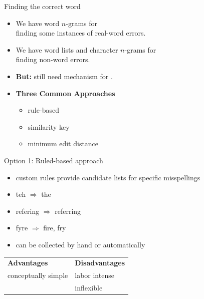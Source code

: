 \documentclass[professionalfonts, xcolor={usenames,svgnames,x11names,table}]{beamer}
\begin{document}
\begin{frame}{Finding the correct word}
    \begin{itemize}
        \item We have word $n$-grams for\\
              finding some instances of real-word errors.
        \item We have word lists and character $n$-grams for\\
              finding non-word errors.
        \item \textbf{But:} still need mechanism for .
        \item \textbf{Three Common Approaches}
            \begin{itemize}
                \item rule-based
                \item similarity key
                \item minimum edit distance
            \end{itemize}
    \end{itemize}
\end{frame}

\begin{frame}{Option 1: Ruled-based approach}
    \begin{itemize}
        \item custom rules provide candidate lists for specific misspellings
    \end{itemize}
    \begin{example}
        \begin{itemize}
            \item teh $\Rightarrow$ the
            \item refering $\Rightarrow$ referring
            \item fyre $\Rightarrow$ fire, fry
        \end{itemize}
    \end{example}
    \begin{itemize}
        \item can be collected by hand or automatically
    \end{itemize}
    \pause
    \begin{center}
        \begin{tabular}{ll}
            \textbf{Advantages} & \textbf{Disadvantages}\\
            conceptually simple & labor intense\\
                                & inflexible
        \end{tabular}
    \end{center}
\end{frame}
\end{document}
